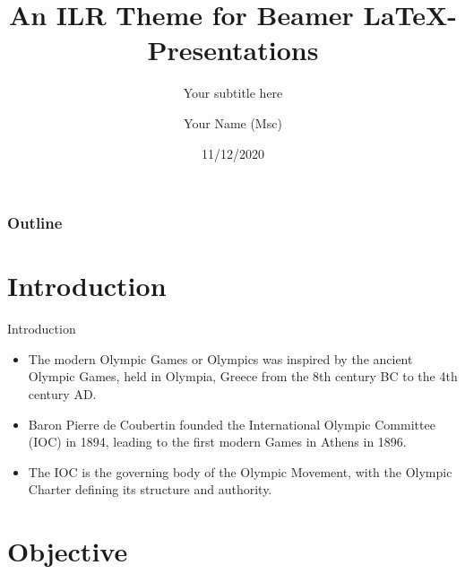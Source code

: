 \documentclass[xcolor=table]{beamer}
\title[An ILR Theme for Beamer \LaTeX]{An ILR Theme for Beamer  \LaTeX - Presentations} %
\subtitle{Your subtitle here}
\author[Your Name (Msc) ]{Your Name (Msc) } %
\institute[YIN] %
{

xxx seminar 2020\\
Institute of xxx\\
University of xxx \\
\vspace{12pt}
Supervisor: Prof.Dr.xxxx
\vspace*{\fill}

}
\date{11/12/2020} %
\begin{document}
\begin{frame}[plain]
\titlepage %
\end{frame}

\begin{frame}
\frametitle{Outline} %
\tableofcontents %
\end{frame}

\section{Introduction}
\begin{frame}{Introduction}
    \begin{itemize}
        \item The modern Olympic Games or Olympics was inspired by the ancient Olympic Games, held in Olympia, Greece from the 8th century BC to the 4th century AD. 
        \item Baron Pierre de Coubertin founded the International Olympic Committee (IOC) in 1894, leading to the first modern Games in Athens in 1896. 
        \item The IOC is the governing body of the Olympic Movement, with the Olympic Charter defining its structure and authority.
\end{itemize}
\end{frame}



\section{Objective}
\end{document}
